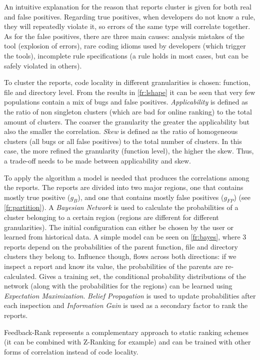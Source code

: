 \documentclass{article}
\begin{document}
 An intuitive explanation for the reason that reports cluster is given for both real and false positives. Regarding true positives, when developers do not know a rule, they will repeatedly violate it, so errors of the same type will correlate together. As for the false positives, there are three main causes: analysis mistakes of the tool (explosion of errors), rare coding idioms used by developers (which trigger the tools), incomplete rule specifications (a rule holds in most cases, but can be safely violated in others).

 To cluster the reports, code locality in different granularities is chosen: function, file and directory level. From the results in \cref{fr:lshape} it can be seen that very few populations contain a mix of bugs and false positives. \textit{Applicability} is defined as the ratio of non singleton clusters (which are bad for online ranking) to the total amount of clusters. The coarser the granularity the greater the applicability but also the smaller the correlation. \textit{Skew} is defined as the ratio of homogeneous clusters (all bugs or all false positives) to the total number of clusters. In this case, the more refined the granularity (function level), the higher the skew. Thus, a trade-off needs to be made between applicability and skew.

 To apply the algorithm a model is needed that produces the correlations among the reports. The reports are divided into two major regions, one that contains mostly true positive ($g_B$), and one that contains mostly false positives ($g_{FP}$) (see \cref{fr:partition}). A \textit{Bayesian Network} is used to calculate the probabilities of a cluster belonging to a certain region (regions are different for different granularities). The initial configuration can either be chosen by the user or learned from historical data. A simple model can be seen on \cref{fr:bayes}, where 3 reports depend on the probabilities of the parent function, file and directory clusters they belong to. Influence though, flows across both directions: if we inspect a report and know its value, the probabilities of the parents are re-calculated. Gives a training set, the conditional probability distributions of the network (along with the probabilities for the regions) can be learned using \textit{Expectation Maximization}. \textit{Belief Propagation} is used to update probabilities after each inspection and \textit{Information Gain} is used as a secondary factor to rank the reports. 

 Feedback-Rank represents a complementary approach to static ranking schemes (it can be combined with Z-Ranking for example) and can be trained with other forms of correlation instead of code locality. 
\end{document}
